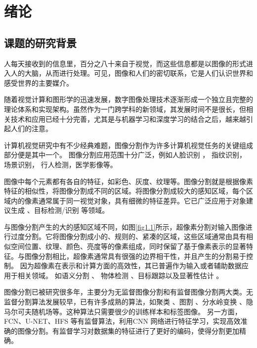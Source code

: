 
\chapter{绪论}
\section{课题的研究背景}

人每天接收到的信息里，百分之八十来自于视觉，而这些信息都是以图像的形式进入人的大脑，从而进行处理。可见，图像和人们的密切联系，它是人们认识世界和感受世界的主要媒介。

随着视觉计算和图形学的迅速发展，数字图像处理技术逐渐形成一个独立且完整的理论体系和实现架构。虽然作为一门跨学科的新领域，其发展时间不是很长，但相关技术和应用已经十分完善，尤其是与机器学习和深度学习的结合之后，越来越引起人们的注意。

计算机视觉研究中有不少经典难题，图像分割作为许多计算机视觉任务的关键组成部分便是其中一个。
图像分割应用范围十分广泛，例如人脸识别
\cite{2004WuAHL04,2013ChenCWS13,CaoWWS12}，
指纹识别\cite{ShawabkaRDJR20,GuptaKGC20}，
场景识别\cite{farabet2012learning,xiao2018unified}，
行人检测\cite{pont2016multiscale}，医学影像\cite{Yan0RW18,FanCYS19}等。


图像中每个元素都有各自的特征，如彩色、灰度、纹理等。图像分割就是根据像素特征的相似性，将图像分割成不同的区域。将图像分割成较大的感知区域，每个区域内的像素通常属于同一视觉对象，具有细微的特征差异。它已广泛应用于对象建议生成
\cite{yan2015object,juneja2013blocks}、目标检测/识别
\cite{conze2019unsupervised,zhu2014saliency}等领域。

与图像分割产生的大的感知区域不同，如图\ref{fig1.1}所示，超像素分割对输入图像进行过度分割。它将图像分割成小的、规则的、紧凑的区域，这些区域通常由具有相似空间位置、纹理、颜色、亮度等的像素组成，同时保留了基于像素表示的显著特征。与图像分割相比，超像素通常具有很强的边界相干性，并且产生的分割易于控制。
因为超像素在表示和计算方面的高效性，其已普遍作为输入或者辅助数据应用于相关领域。
如语义分割 \cite{gould2008multi,gadde2016superpixel,sharma2014recursive,xie2019automatic}、 物体检测
\cite{kohli2009robust,shu2013improving}、目标跟踪\cite{wang2011superpixel,yang2014robust}以及显著性估计
\cite{he2015supercnn,yang2013saliency}。

图像分割已被研究很多年，主要分为无监督图像分割和有监督图像分割两大类。无监督分割算法发展较早，已有许多成熟的算法，如聚类
\cite{abu2015integrative,zeng2017unified}、图割
\cite{ma2016unsupervised,uijlings2013selective}、分水岭变换
\cite{bai2017deep}、隐马尔可夫随机场\cite{pereyra2017fast}等。这种算法只需要很少的训练样本和标签图像。
另一方面，FCN\cite{long2015fully}、U-NET\cite{ronneberger2015u}、HFS\cite{cheng2016hfs} 等有监督算法，利用CNN 网络\cite{krizhevsky2012imagenet}进行特征学习，实现高效准确的图像分割。有监督学习对数据集的特征进行了更好的编码，使得分割更加精确。


